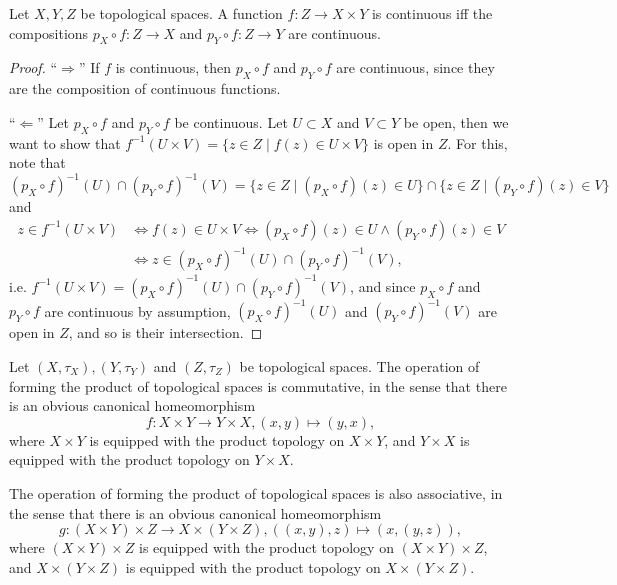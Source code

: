 \begin{theorem}\label{thrm:prod_top_continuity_comps_projs}
	Let $X, Y, Z$ be topological spaces. A function $f: Z\to X\times Y$ is continuous iff the compositions $p_X\circ f: Z\to X$ and $p_Y\circ f: Z\to Y$ are continuous.
\end{theorem}

\begin{proof}
	\enquote{$\Longrightarrow$} If $f$ is continuous, then $p_X\circ f$ and $p_Y\circ f$ are continuous, since they are the composition of continuous functions.
	
	\enquote{$\Longleftarrow$} Let $p_X\circ f$ and $p_Y\circ f$ be continuous. Let $U\subset X$ and $V\subset Y$ be open, then we want to show that $f^{-1}(U\times V) = \{z\in Z\mid f(z)\in U\times V\}$ is open in $Z$. For this, note that $$\left(p_X\circ f\right)^{-1}(U) \cap \left(p_Y\circ f\right)^{-1}(V) = \{z\in Z\mid (p_X\circ f)(z) \in U\} \cap \{z\in Z\mid (p_Y\circ f)(z)\in V\}$$ and
	\begin{align*}
		z\in f^{-1}(U\times V) &\Leftrightarrow f(z)\in U\times V \Leftrightarrow (p_X\circ f)(z) \in U \wedge (p_Y\circ f)(z)\in V
		\\ &\Leftrightarrow z\in (p_X\circ f)^{-1}(U)\cap (p_Y\circ f)^{-1}(V),
	\end{align*}
	i.e. $f^{-1}(U\times V) = (p_X\circ f)^{-1}(U)\cap (p_Y\circ f)^{-1}(V)$, and since $p_X\circ f$ and $p_Y\circ f$ are continuous by assumption, $(p_X\circ f)^{-1}(U)$ and $(p_Y\circ f)^{-1}(V)$ are open in $Z$, and so is their intersection.
\end{proof}

\begin{remark}\label{remark:op_prod_top_spaces_comm_associat}
	Let $(X, \tau_X), (Y, \tau_Y)$ and $(Z, \tau_Z)$ be topological spaces. The operation of forming the product of topological spaces is commutative, in the sense that there is an obvious canonical homeomorphism $$f: X\times Y\to Y\times X, (x, y)\mapsto (y, x),$$ where $X\times Y$ is equipped with the product topology on $X\times Y$, and $Y\times X$ is equipped with the product topology on $Y\times X$. 
	
	The operation of forming the product of topological spaces is also associative, in the sense that there is an obvious canonical homeomorphism $$g: \left(X\times Y\right)\times Z\to X\times (Y\times Z), ((x, y), z)\mapsto (x, (y, z)),$$ where $(X\times Y)\times Z$ is equipped with the product topology on $(X\times Y)\times Z$, and $X\times (Y\times Z)$ is equipped with the product topology on $X\times (Y\times Z)$.
\end{remark}

